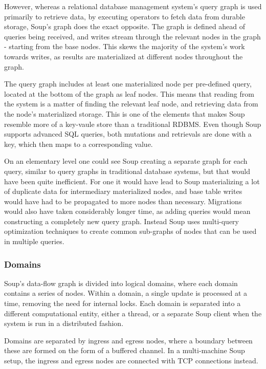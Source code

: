 \documentclass[b5paper]{report}
\begin{document}
However, whereas a relational database management system's query graph is used
primarily to retrieve data, by executing operators to fetch data from durable
storage, Soup's graph does the exact opposite. The graph is defined ahead of
queries being received, and writes stream through the relevant nodes in the
graph - starting from the base nodes. This skews the majority of the system's
work towards writes, as results are materialized at different nodes throughout
the graph.

The query graph includes at least one materialized node per pre-defined query,
located at the bottom of the graph as leaf nodes. This means that reading from
the system is a matter of finding the relevant leaf node, and retrieving data
from the node's materialized storage. This is one of the elements that makes Soup
resemble more of a key-vaule store than a traditional RDBMS. Even though Soup
supports advanced SQL queries, both mutations and retrievals are done with a
key, which then maps to a corresponding value.

On an elementary level one could see Soup creating a separate graph for each
query, similar to query graphs in traditional database systems, but that would
have been quite inefficient. For one it would have lead to Soup materializing a
lot of duplicate data for intermediary materialized nodes, and base table writes
would have had to be propagated to more nodes than necessary. Migrations would
also have taken considerably longer time, as adding queries would mean
constructing a completely new query graph. Instead Soup uses multi-query
optimization techniques to create common sub-graphs of nodes that can be used in
multiple queries.

\subsubsection{Domains}
Soup's data-flow graph is divided into logical domains, where each domain
contains a series of nodes. Within a domain, a single update is processed at a
time, removing the need for internal locks. Each domain is separated into a
different computational entity, either a thread, or a separate Soup client when
the system is run in a distributed fashion.

Domains are separated by ingress and egress nodes, where a boundary between
these are formed on the form of a buffered channel. In a multi-machine Soup
setup, the ingress and egress nodes are connected with TCP connections instead.
\end{document}
